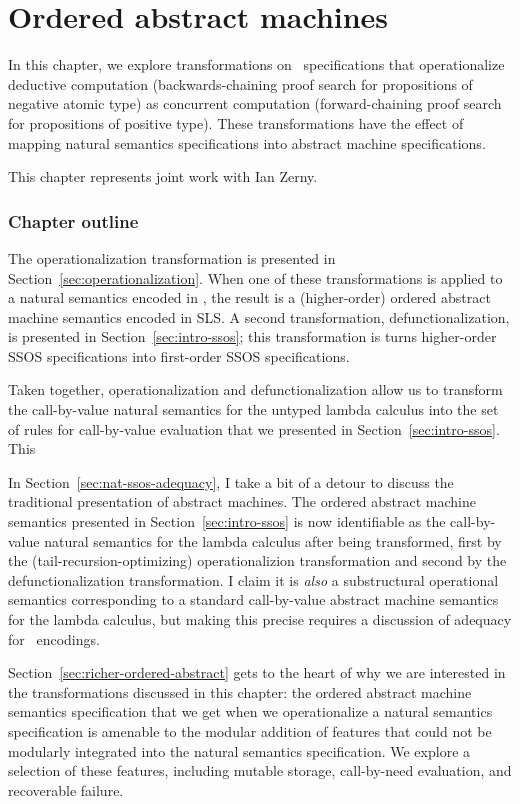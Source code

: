 \chapter{Ordered abstract machines}


In this chapter, we explore transformations on \sls~specifications
that operationalize deductive computation (backwards-chaining proof
search for propositions of negative atomic type) as concurrent
computation (forward-chaining proof search for propositions of
positive type). These transformations have the effect of mapping
natural semantics specifications into abstract machine specifications.


This chapter represents joint work with Ian Zerny.

\subsection*{Chapter outline}

The operationalization transformation is presented in
Section~\ref{sec:operationalization}. When one of these
transformations is applied to a natural semantics encoded in \sls, the
result is a (higher-order) ordered abstract machine semantics encoded
in SLS. A second transformation, defunctionalization, is presented in
Section~\ref{sec:intro-ssos}; this transformation is turns
higher-order SSOS specifications into first-order SSOS specifications.

Taken together, operationalization and defunctionalization allow us to
transform the call-by-value natural semantics for the untyped lambda
calculus into the set of rules for call-by-value evaluation that we
presented in Section~\ref{sec:intro-ssos}. This 



In Section~\ref{sec:nat-ssos-adequacy}, I take a bit of a detour to
discuss the traditional presentation of abstract machines. The ordered
abstract machine semantics presented in Section~\ref{sec:intro-ssos}
is now identifiable as the call-by-value natural semantics for the
lambda calculus after being transformed, first by the
(tail-recursion-optimizing) operationalizion transformation and second
by the defunctionalization transformation. I claim it is {\it also} a
substructural operational semantics corresponding to a standard
call-by-value abstract machine semantics for the lambda calculus, but
making this precise requires a discussion of adequacy for
\sls~encodings. 

Section~\ref{sec:richer-ordered-abstract} gets to the heart of why we
are interested in the transformations discussed in this chapter: the
ordered abstract machine semantics specification that we get when we
operationalize a natural semantics specification is amenable to the
modular addition of features that could not be modularly integrated
into the natural semantics specification. We explore a selection of
these features, including mutable storage, call-by-need evaluation,
and recoverable failure.

